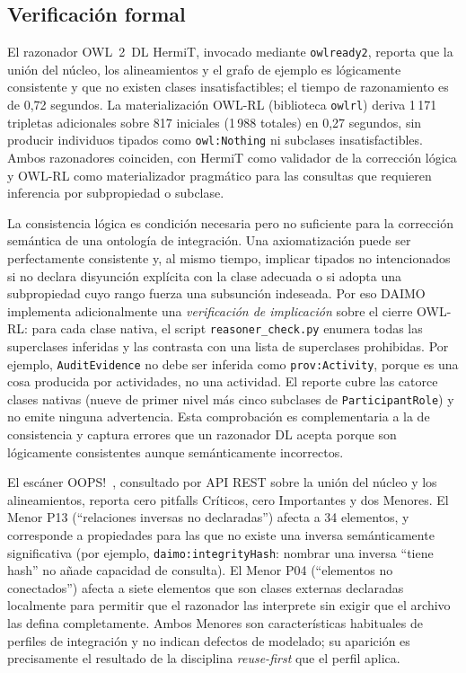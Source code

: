 \documentclass[11pt,a4paper]{article}
\newcommand{\code}[1]{\texttt{#1}}
\begin{document}
\subsection{Verificación formal}\label{sec:eval-engineering}

El razonador OWL~2~DL HermiT, invocado mediante \code{owlready2}, reporta que la unión del núcleo, los alineamientos y el grafo de ejemplo es lógicamente consistente y que no existen clases insatisfactibles; el tiempo de razonamiento es de 0,72 segundos. La materialización OWL-RL (biblioteca \code{owlrl}) deriva 1\,171 tripletas adicionales sobre 817 iniciales (1\,988 totales) en 0,27 segundos, sin producir individuos tipados como \code{owl:Nothing} ni subclases insatisfactibles. Ambos razonadores coinciden, con HermiT como validador de la corrección lógica y OWL-RL como materializador pragmático para las consultas que requieren inferencia por subpropiedad o subclase.

La consistencia lógica es condición necesaria pero no suficiente para la corrección semántica de una ontología de integración. Una axiomatización puede ser perfectamente consistente y, al mismo tiempo, implicar tipados no intencionados si no declara disyunción explícita con la clase adecuada o si adopta una subpropiedad cuyo rango fuerza una subsunción indeseada. Por eso DAIMO implementa adicionalmente una \emph{verificación de implicación} sobre el cierre OWL-RL: para cada clase nativa, el script \code{reasoner\_check.py} enumera todas las superclases inferidas y las contrasta con una lista de superclases prohibidas. Por ejemplo, \code{AuditEvidence} no debe ser inferida como \code{prov:Activity}, porque es una cosa producida por actividades, no una actividad. El reporte cubre las catorce clases nativas (nueve de primer nivel más cinco subclases de \code{ParticipantRole}) y no emite ninguna advertencia. Esta comprobación es complementaria a la de consistencia y captura errores que un razonador DL acepta porque son lógicamente consistentes aunque semánticamente incorrectos.

El escáner OOPS!~\cite{oops14}, consultado por API REST sobre la unión del núcleo y los alineamientos, reporta cero pitfalls Críticos, cero Importantes y dos Menores. El Menor P13 (``relaciones inversas no declaradas'') afecta a 34 elementos, y corresponde a propiedades para las que no existe una inversa semánticamente significativa (por ejemplo, \code{daimo:integrityHash}: nombrar una inversa ``tiene hash'' no añade capacidad de consulta). El Menor P04 (``elementos no conectados'') afecta a siete elementos que son clases externas declaradas localmente para permitir que el razonador las interprete sin exigir que el archivo las defina completamente. Ambos Menores son características habituales de perfiles de integración y no indican defectos de modelado; su aparición es precisamente el resultado de la disciplina \emph{reuse-first} que el perfil aplica.
\end{document}
